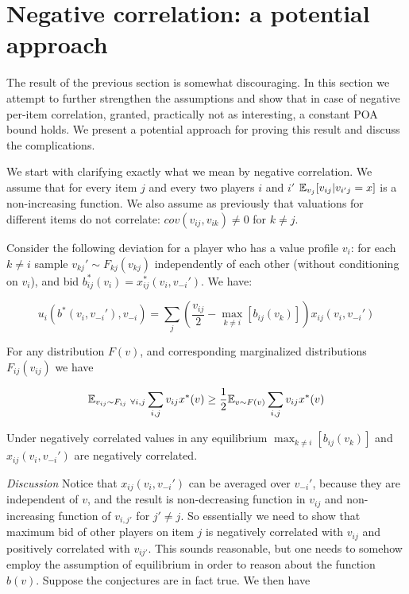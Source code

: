 \section{Negative correlation: a potential approach}
The result of the previous section is somewhat discouraging. In this section we attempt to further strengthen the assumptions and show that in case of negative per-item correlation, granted, practically not as interesting, a constant POA bound holds. We present a potential approach for proving this result and discuss the complications.

We start with clarifying exactly what we mean by negative correlation. We assume that for every item $j$ and every two players $i$ and $i'$ ${\mathbb{E}}_{v_j}[v_{ij}|v_{i'j}=x]$ is a non-increasing function. We also assume as previously that valuations for different items do not correlate: $cov(v_{ij},v_{ik})\neq 0$ for $k\neq j$.

Consider the following deviation for a player who has a value profile $v_i$: for each $k\neq i$ sample $v_{kj}'\sim F_{kj}(v_{kj})$ independently of each other (without conditioning on $v_i$), and bid $b_{ij}^*(v_i) = x^*_{ij}(v_i,v_{-i}')$. We have:

$$u_i(b^*(v_i,v_{-i}'),v_{-i}) = \sum_j \left ( \frac{v_{ij}}{2}-\max_{k\neq i}[b_{ij}(v_k)]\right)x_{ij}(v_i,v_{-i}')$$


\begin{conjecture}
For any distribution $F(v)$, and corresponding marginalized distributions $F_{ij}(v_{ij})$ we have

$${\mathbb{E}}_{v_{ij}\sim F_{ij}\ \forall i,j} \sum_{i,j} v_{ij}x^*(v)\geq \frac{1}{2}{\mathbb{E}}_{v \sim F(v)}  \sum_{i,j} v_{ij}x^*(v)$$
\end{conjecture}



\begin{conjecture}
Under negatively correlated values in any equilibrium $\max_{k\neq i}[b_{ij}(v_k)]$ and $x_{ij}(v_i,v_{-i}')$ are negatively correlated.
\end{conjecture}

\textit{Discussion} Notice that $x_{ij}(v_i,v_{-i}')$ can be averaged over $v_{-i}'$, because they are independent of $v$, and the result is non-decreasing function in $v_{ij}$ and non-increasing function of $v_{i,j'}$ for $j'\neq j$. So essentially we need to show that maximum bid of other players on item $j$ is negatively correlated with $v_{ij}$ and positively correlated with $v_{ij'}$. This sounds reasonable, but one needs to somehow employ the assumption of equilibrium in order to reason about the function $b(v)$.
\bigskip
\newline Suppose the conjectures are in fact true. We then have

